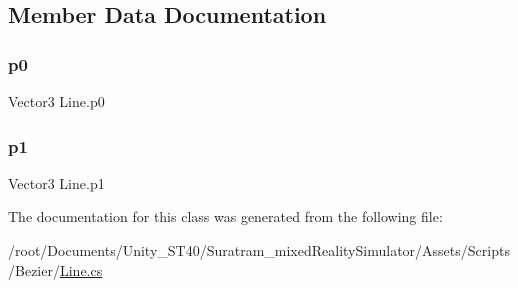 \subsection{Member Data Documentation}
\mbox{\label{classLine_a20d5ecabee2113e42017734b748b485d}} 
\subsubsection{\texorpdfstring{p0}{p0}}
{\footnotesize\ttfamily Vector3 Line.\+p0}

\mbox{\label{classLine_aaecb847629b70b917115e59873531cdb}} 
\subsubsection{\texorpdfstring{p1}{p1}}
{\footnotesize\ttfamily Vector3 Line.\+p1\hspace{0.3cm}{\ttfamily [private]}}



The documentation for this class was generated from the following file\+:\begin{DoxyCompactItemize}
\item 
/root/\+Documents/\+Unity\+\_\+\+S\+T40/\+Suratram\+\_\+mixed\+Reality\+Simulator/\+Assets/\+Scripts/\+Bezier/\hyperlink{Line_8cs}{Line.\+cs}\end{DoxyCompactItemize}
